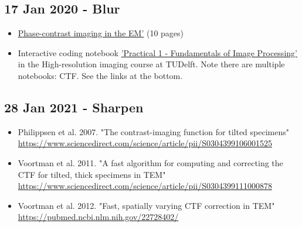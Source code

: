 \documentclass[11pt, oneside]{article}   	%
\begin{document}
\subsection{17 Jan 2020 - Blur}
\begin{itemize}
	\item \href{https://cryoemprinciples.yale.edu/sites/default/files/files/2%20Phase%20contrast.pdf}{Phase-contrast imaging in the EM'} (10 pages)
	\item Interactive coding notebook \href{https://gitlab.tudelft.nl/aj-lab/teaching/-/wikis/NB4020}{'Practical 1 - Fundamentals of Image Processing'} in the High-resolution imaging course at TUDelft. Note there are multiple notebooks: CTF. See the links at the bottom.
\end{itemize}

\subsection{28 Jan 2021 - Sharpen}
\begin{itemize}
	\item  Philippsen et al. 2007. "The contrast-imaging function for tilted specimens" \url{https://www.sciencedirect.com/science/article/pii/S0304399106001525}
	\item Voortman et al. 2011. "A fast algorithm for computing and correcting the CTF for tilted, thick specimens in TEM" \url{https://www.sciencedirect.com/science/article/pii/S0304399111000878}
	\item Voortman et al. 2012. "Fast, spatially varying CTF correction in TEM" \url{https://pubmed.ncbi.nlm.nih.gov/22728402/}	
\end{itemize}
\end{document}

